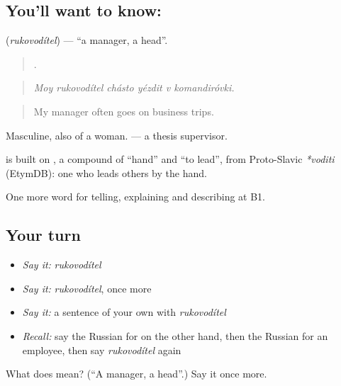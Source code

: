 \subsection*{You'll want to know: }
\textbf{} (\emph{rukovodítel}) — \textquotedblleft{}a manager, a head\textquotedblright{}.

\begin{quote}
     .
\end{quote}

\begin{quote}
\emph{Moy rukovodítel chásto yézdit v komandiróvki.}
\end{quote}

\begin{quote}
My manager often goes on business trips.
\end{quote}

Masculine, also of a woman. \emph{ } — a thesis supervisor.

\begin{cousinweb}
\textbf{} is built on \emph{}, a compound of \emph{} \textquotedblleft{}hand\textquotedblright{} and \emph{} \textquotedblleft{}to lead\textquotedblright{}, from Proto-Slavic \emph{*voditi} (EtymDB): one who leads others by the hand.
\end{cousinweb}

\begin{grammarlens}[title={What you've built}]
One more word for telling, explaining and describing at B1.
\end{grammarlens}

\subsection*{Your turn}
\begin{itemize}
\raggedright
  \item \emph{Say it:} \emph{rukovodítel}
  \item \emph{Say it:} \emph{rukovodítel}, once more
  \item \emph{Say it:} a sentence of your own with \emph{rukovodítel}
  \item \emph{Recall:} say the Russian for on the other hand, then the Russian for an employee, then say \emph{rukovodítel} again
\end{itemize}

\begin{tcolorbox}[breakable,colback=teal!4,colframe=teal!35!black,title={Before you move on}]
What does  mean? (\textquotedblleft{}A manager, a head\textquotedblright{}.) Say it once more.
\end{tcolorbox}
